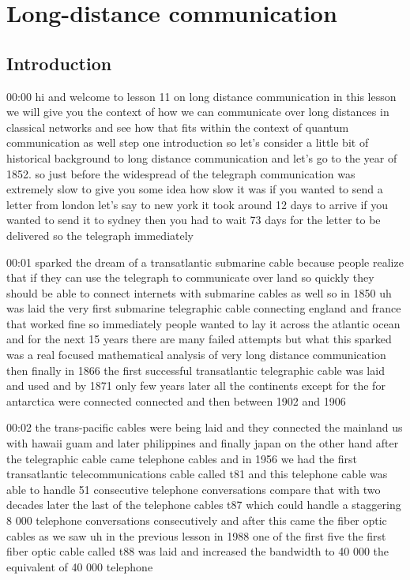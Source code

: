 \chapter{Long-distance communication}

\section{Introduction}

00:00
hi and welcome to lesson 11 on long distance communication
in this lesson we will give you the context of how we can communicate over
long distances in classical networks and see how that
fits within the context of quantum communication as well step one introduction
so let's consider a little bit of historical background to
long distance communication and let's go to the year of 1852.
so just before the widespread of the telegraph communication was extremely slow
to give you some idea how slow it was if you wanted to send a letter from london
let's say to new york it took around 12 days
to arrive if you wanted to send it to sydney then you had to wait 73 days for
the letter to be delivered so the telegraph immediately

00:01
sparked the dream of a transatlantic submarine cable because people realize
that if they can use the telegraph to communicate over land so quickly they
should be able to connect internets with submarine cables as well
so in 1850 uh was laid the very first submarine telegraphic cable connecting
england and france that worked fine so immediately people
wanted to lay it across the atlantic ocean
and for the next 15 years there are many failed attempts
but what this sparked was a real focused mathematical analysis of very long
distance communication then finally in 1866 the first
successful transatlantic telegraphic cable was laid and used and by 1871
only few years later all the continents except for the
for antarctica were connected connected and then between 1902 and 1906

00:02
the trans-pacific cables were being laid and they connected the mainland us with
hawaii guam and later philippines and finally japan
on the other hand after the telegraphic cable came telephone cables and in 1956
we had the first transatlantic telecommunications cable called t81
and this telephone cable was able to handle 51 consecutive telephone
conversations compare that with two decades later the
last of the telephone cables t87 which could handle a staggering 8
000 telephone conversations consecutively and after this came the fiber optic
cables as we saw uh in the previous lesson in 1988
one of the first five the first fiber optic cable called t88 was laid
and increased the bandwidth to 40 000 the equivalent of 40 000 telephone


